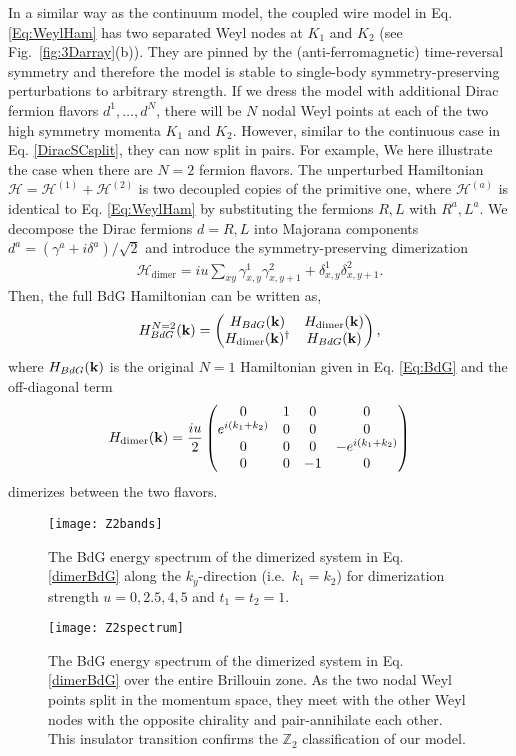 In a similar way as the continuum model, the coupled wire model in Eq. \eqref{Eq:WeylHam} has two separated Weyl nodes at $K_1$ and $K_2$ (see Fig.~\ref{fig:3Darray}(b)). They are pinned by the (anti-ferromagnetic) time-reversal symmetry and therefore the model is stable to single-body symmetry-preserving perturbations to arbitrary strength. If we dress the model with additional Dirac fermion flavors $d^1,\ldots,d^N$, there will be $N$ nodal Weyl points at each of the two high symmetry momenta $K_1$ and $K_2$. However, similar to the continuous case in Eq. \eqref{DiracSCsplit}, they can now split in pairs. For example, We here illustrate the case when there are $N=2$ fermion flavors. The unperturbed Hamiltonian $\mathcal{H}=\mathcal{H}^{(1)}+\mathcal{H}^{(2)}$ is two decoupled copies of the primitive one, where $\mathcal{H}^{(a)}$ is identical to Eq. \eqref{Eq:WeylHam} by substituting the fermions $R,L$ with $R^a,L^a$. We decompose the Dirac fermions $d=R,L$ into Majorana components $d^a=(\gamma^a+i\delta^a)/\sqrt{2}$ and introduce the symmetry-preserving dimerization \begin{align}\mathcal{H}_{\mathrm{dimer}}=iu\sum_{xy}\gamma^1_{x,y}\gamma^2_{x,y+1}+\delta^1_{x,y}\delta^2_{x,y+1}.\label{Hdimer}\end{align} Then, the full BdG Hamiltonian can be written as,
\begin{align}H_{BdG}^{N=2}({\bf k})=\begin{pmatrix}H_{BdG}({\bf k})&H_{\mathrm{dimer}}({\bf k})\\H_{\mathrm{dimer}}({\bf k})^\dagger&H_{BdG}({\bf k})\end{pmatrix},\label{dimerBdG}
\end{align}
where $H_{BdG}({\bf k})$ is the original $N=1$ Hamiltonian given in Eq. \eqref{Eq:BdG} and the off-diagonal term \begin{align}H_{\mathrm{dimer}}({\bf k})=\frac{iu}{2}\begin{pmatrix}0&1&0&0\\e^{i(k_1+k_2)}&0&0&0\\0&0&0&-e^{i(k_1+k_2)}\\0&0&-1&0\end{pmatrix}\end{align} dimerizes between the two flavors.

\begin{figure}[htbp]
	\centering\texttt{[image: Z2bands]}
	\caption[The BdG energy spectrum of the dimerized system.]{The BdG energy spectrum of the dimerized system in Eq. \eqref{dimerBdG} along the $k_y$-direction (i.e.~$k_1=k_2$) for dimerization strength $u=0,2.5,4,5$ and $t_1=t_2=1$.}\label{fig:Z2bands}
	\centering\texttt{[image: Z2spectrum]}
	\caption[The BdG energy spectrum of the dimerized system over the entire Brillouin zone.]{The BdG energy spectrum of the dimerized system in Eq. \eqref{dimerBdG} over the entire Brillouin zone. As the two nodal Weyl points split in the momentum space, they meet with the other Weyl nodes with the opposite chirality and pair-annihilate each other. This insulator transition confirms the $\mathbb{Z}_2$ classification of our model.}\label{fig:Z2spectrum}
\end{figure}

